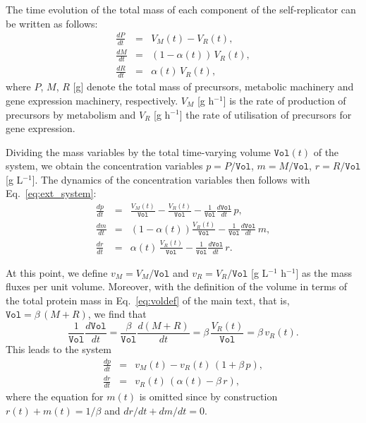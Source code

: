 The time evolution of the total mass of each component of the self-replicator can be written as follows:
\begin{eqnarray}
\frac{dP}{dt} &=& V_M(t) - V_R(t) \nonumber , \\
\frac{dM}{dt} &=& (1-\alpha(t))\, V_R(t) \label{eq:ext_system},\\
\frac{dR}{dt} &=& \alpha(t) \, V_R(t)  \nonumber ,
\end{eqnarray}
where $P$, $M$, $R$ [g] denote the total mass of precursors, metabolic machinery and gene expression machinery, respectively.
$V_M$ [g h$^{-1}$] is the rate of production of precursors by metabolism and $V_R$ [g h$^{-1}$] the rate of utilisation of precursors for gene expression.

Dividing the mass variables by the total time-varying volume $\texttt{Vol}(t)$ of the system, we obtain the concentration variables $p = P/\texttt{Vol}$, $m = M/\texttt{Vol}$, $r = R/\texttt{Vol}$ [g L$^{-1}$].
The dynamics of the concentration variables then follows with Eq.~\ref{eq:ext_system}:
\begin{eqnarray}
\frac{dp}{dt} &=& \frac{V_M(t)}{\texttt{Vol}} - \frac{V_R(t)}{\texttt{Vol}} - \frac{1}{\texttt{Vol}}\frac{d\texttt{Vol}}{dt}\, p, \nonumber \\
\frac{dm}{dt} &=& (1-\alpha(t)) \frac{V_R(t)}{\texttt{Vol}} - \frac{1}{\texttt{Vol}}\frac{d\texttt{Vol}}{dt} \, m  \label{eq:deriv_int_system},\\ 
\frac{dr}{dt} &=& \alpha(t) \, \frac{V_R(t)}{\texttt{Vol}}  - \frac{1}{\texttt{Vol}}\frac{d\texttt{Vol}}{dt} \, r. \nonumber
\end{eqnarray}

At this point, we define $v_M = V_M/\texttt{Vol}$ and $v_R = V_R/\texttt{Vol}$ [g L$^{-1}$ h$^{-1}$] as the mass fluxes per unit volume.
Moreover, with the definition of the volume in terms of the total protein mass in Eq.~\ref{eq:voldef} of the main text, that is, $\texttt{Vol} = \beta\, (M + R)$, we find that
\begin{equation}
\label{eq:supp_deriv_growthrate}
\frac{1}{\texttt{Vol}} \frac{d\texttt{Vol}}{dt} = \frac{\beta}{\texttt{Vol}} \frac{d(M+R)}{dt} = \beta\, \frac{V_R(t)}{\texttt{Vol}} = \beta \, v_R(t).
\end{equation}
This leads to the system
\begin{eqnarray}
\frac{dp}{dt} &=& v_M(t) - v_R(t) \, (1+\beta\, p), \label{eq:supp_pdef}\\
\frac{dr}{dt} &=& v_R(t)  \, (\alpha(t) - \beta\, r) \label{eq:supp_rdef},
\end{eqnarray}
where the equation for $m(t)$ is omitted since by construction $r(t) + m(t) = 1/\beta$ and $dr/dt + dm/dt = 0$.

